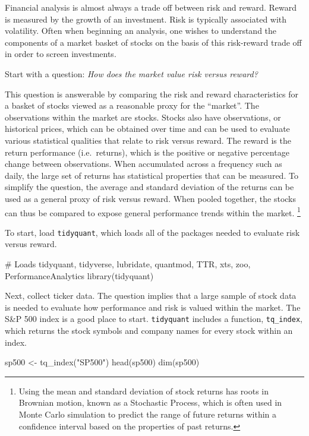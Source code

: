 Financial analysis is almost always a trade off between risk and reward.
Reward is measured by the growth of an investment. Risk is typically
associated with volatility. Often when beginning an analysis, one wishes
to understand the components of a market basket of stocks on the basis
of this risk-reward trade off in order to screen investments.

Start with a question: \emph{How does the market value risk versus
reward?}

This question is answerable by comparing the risk and reward
characteristics for a basket of stocks viewed as a reasonable proxy for
the ``market''. The observations within the market are stocks. Stocks
also have observations, or historical prices, which can be obtained over
time and can be used to evaluate various statistical qualities that
relate to risk versus reward. The reward is the return performance
(i.e.~returns), which is the positive or negative percentage change
between observations. When accumulated across a frequency such as daily,
the large set of returns has statistical properties that can be
measured. To simplify the question, the average and standard deviation
of the returns can be used as a general proxy of risk versus reward.
When pooled together, the stocks can thus be compared to expose general
performance trends within the market.
\footnote{Using the mean and standard deviation of stock returns has roots in Brownian motion, known as a Stochastic Process, which is often used in Monte Carlo simulation to predict the range of future returns within a confidence interval based on the properties of past returns. }

To start, load \texttt{tidyquant}, which loads all of the packages
needed to evaluate risk versus reward.

\begin{Schunk}
\begin{Sinput}
# Loads tidyquant, tidyverse, lubridate, quantmod, TTR, xts, zoo, PerformanceAnalytics
library(tidyquant)
\end{Sinput}
\end{Schunk}

Next, collect ticker data. The question implies that a large sample of
stock data is needed to evaluate how performance and risk is valued
within the market. The S\&P 500 index is a good place to start.
\texttt{tidyquant} includes a function, \texttt{tq\_index}, which
returns the stock symbols and company names for every stock within an
index.

\begin{Schunk}
\begin{Sinput}
sp500 <- tq_index("SP500")
head(sp500)
dim(sp500)
\end{Sinput}
\end{Schunk}

